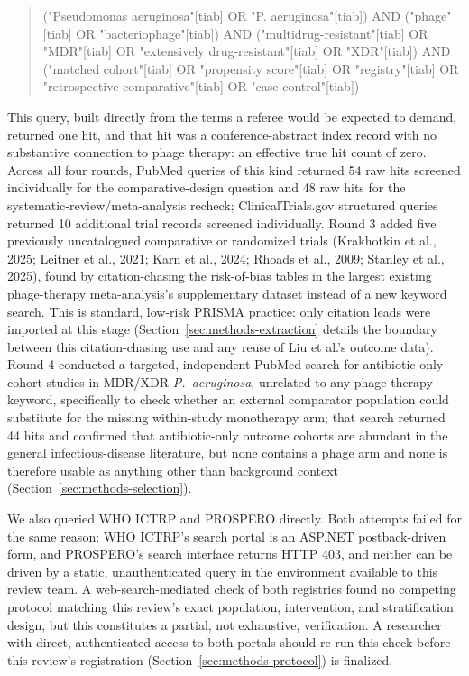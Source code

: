 \begin{quote}
\footnotesize\ttfamily
("Pseudomonas aeruginosa"[tiab] OR "P. aeruginosa"[tiab]) AND ("phage"[tiab] OR "bacteriophage"[tiab]) AND ("multidrug-resistant"[tiab] OR "MDR"[tiab] OR "extensively drug-resistant"[tiab] OR "XDR"[tiab]) AND ("matched cohort"[tiab] OR "propensity score"[tiab] OR "registry"[tiab] OR "retrospective comparative"[tiab] OR "case-control"[tiab])
\end{quote}

\noindent This query, built directly from the terms a referee would be expected to demand, returned one hit, and that hit was a conference-abstract index record with no substantive connection to phage therapy: an effective true hit count of zero. Across all four rounds, PubMed queries of this kind returned 54 raw hits screened individually for the comparative-design question and 48 raw hits for the systematic-review/meta-analysis recheck; ClinicalTrials.gov structured queries returned 10 additional trial records screened individually. Round 3 added five previously uncatalogued comparative or randomized trials (Krakhotkin et al., 2025; Leitner et al., 2021; Karn et al., 2024; Rhoads et al., 2009; Stanley et al., 2025), found by citation-chasing the risk-of-bias tables in the largest existing phage-therapy meta-analysis's supplementary dataset \parencite{Liu2025_ijaa} instead of a new keyword search. This is standard, low-risk PRISMA practice: only citation leads were imported at this stage (Section~\ref{sec:methods-extraction} details the boundary between this citation-chasing use and any reuse of Liu et al.'s outcome data). Round 4 conducted a targeted, independent PubMed search for antibiotic-only cohort studies in MDR/XDR \textit{P.\ aeruginosa}, unrelated to any phage-therapy keyword, specifically to check whether an external comparator population could substitute for the missing within-study monotherapy arm; that search returned 44 hits and confirmed that antibiotic-only outcome cohorts are abundant in the general infectious-disease literature, but none contains a phage arm and none is therefore usable as anything other than background context (Section~\ref{sec:methods-selection}).

We also queried WHO ICTRP and PROSPERO directly. Both attempts failed for the same reason: WHO ICTRP's search portal is an ASP.NET postback-driven form, and PROSPERO's search interface returns HTTP 403, and neither can be driven by a static, unauthenticated query in the environment available to this review team. A web-search-mediated check of both registries found no competing protocol matching this review's exact population, intervention, and stratification design, but this constitutes a partial, not exhaustive, verification. A researcher with direct, authenticated access to both portals should re-run this check before this review's registration (Section~\ref{sec:methods-protocol}) is finalized.

